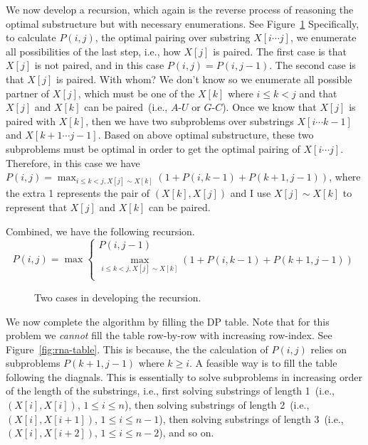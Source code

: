 We now develop a recursion, which again is the reverse process of reasoning the optimal substructure
but with necessary enumerations.
See Figure~\ref{fig:rna-recursion}
Specifically, to calculate $P(i,j)$, the optimal pairing over substring $X[i\cdots j]$,
we enumerate all possibilities of the last step, i.e., how $X[j]$ is paired.
The first case is that $X[j]$ is not paired, and in this case $P(i,j) = P(i, j-1)$.
The second case is that $X[j]$ is paired. With whom? We don't know so we enumerate
all possible partner of $X[j]$, which must be one of the $X[k]$ where $i \le k < j$
and that $X[j]$ and $X[k]$ can be paired~(i.e., $A$-$U$ or $G$-$C$).
Once we know that $X[j]$ is paired with $X[k]$, then we have two subproblems
over substrings $X[i\cdots k-1]$ and $X[k + 1 \cdots j - 1]$. Based on above optimal substructure,
these two subproblems must be optimal in order to get the optimal pairing of $X[i\cdots j]$.
Therefore, in this case we have $P(i,j) = \max_{i \le k < j, X[j]\sim X[k] } (1 + P(i, k-1) + P(k+1,j-1))$, where
the extra 1 represents the pair of $(X[k], X[j])$ and I use $X[j]\sim X[k]$ to represent that $X[j]$ and $X[k]$ can be paired.

Combined, we have the following recursion.
\begin{displaymath}
P(i,j) = \max\left\{
	\begin{array}{llll}
	P(i,j-1)\\
	\textstyle \max_{i \le k < j, X[j]\sim X[k]} (1 + P(i,k-1) + P(k+1,j-1)) \\
	\end{array}
\right.
\end{displaymath}

\begin{figure}[h]
\centering{}
\caption{Two cases in developing the recursion.}
\label{fig:rna-recursion}
\end{figure}


We now complete the algorithm by filling the DP table.
Note that for this problem we \emph{cannot} fill the table row-by-row with increasing row-index.
See Figure~\ref{fig:rna-table}.
This is because, the the calculation of $P(i,j)$ relies on subproblems $P(k + 1, j - 1)$ where $k \ge i$.
A feasible way is to fill the table following the diagnals.
This is essentially to solve subproblems in increasing order of the length of the substrings, i.e.,
first solving substrings of length 1~(i.e., $(X[i], X[i])$, $1\le i \le n$), 
then solving substrings of length 2~(i.e., $(X[i], X[i + 1])$, $1\le i \le n - 1$), 
then solving substrings of length 3~(i.e., $(X[i], X[i + 2])$, $1\le i \le n - 2$),
and so on. 


